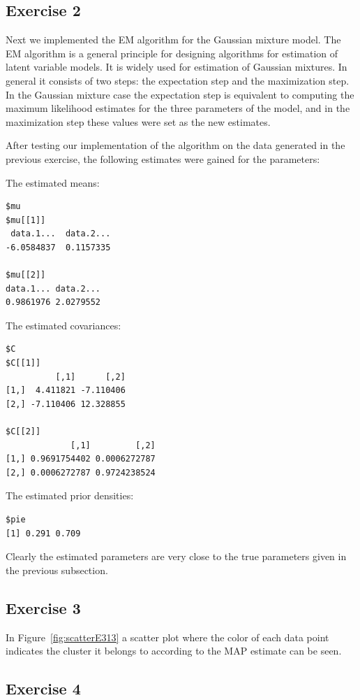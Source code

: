 \documentclass{article}
\begin{document}
\subsection{Exercise 2}
Next we implemented the EM algorithm for the Gaussian mixture
model. The EM algorithm is a general principle for designing
algorithms for estimation of latent variable models. It is widely used
for estimation of Gaussian mixtures. In general it consists of two
steps: the expectation step and the maximization step. In the Gaussian
mixture case the expectation step is equivalent to computing the
maximum likelihood estimates for the three parameters of the model,
and in the maximization step these values were set as the new
estimates.

After testing our implementation of the algorithm on the data generated in the previous
exercise, the following estimates were gained for the parameters:

\noindent The estimated means:
\begin{verbatim}
$mu
$mu[[1]]
 data.1...  data.2... 
-6.0584837  0.1157335 

$mu[[2]]
data.1... data.2... 
0.9861976 2.0279552 
\end{verbatim}

\noindent The estimated covariances:
\begin{verbatim}
$C
$C[[1]]
          [,1]      [,2]
[1,]  4.411821 -7.110406
[2,] -7.110406 12.328855

$C[[2]]
             [,1]         [,2]
[1,] 0.9691754402 0.0006272787
[2,] 0.0006272787 0.9724238524
\end{verbatim}

\noindent The estimated prior densities:
\begin{verbatim}
$pie
[1] 0.291 0.709
\end{verbatim}

Clearly the estimated parameters are very close to the true parameters
given in the previous subsection.

\subsection{Exercise 3}

In Figure~\ref{fig:scatterE313} a scatter plot where the color of each data
point indicates the cluster it belongs to according to the MAP
estimate can be seen.

\subsection{Exercise 4}
\end{document}
